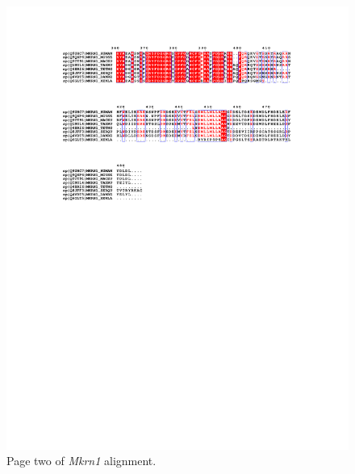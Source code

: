     \FloatBarrier
    \clearpage
    \begin{figure}
        \includegraphics[width=0.8\linewidth]{images/kumar_alignment_supplement_p2.pdf}
        \caption{Page two of \textit{Mkrn1} alignment.}
        \label{fig:mkrn1_alignment2}
    \end{figure}



    \FloatBarrier
    \clearpage
